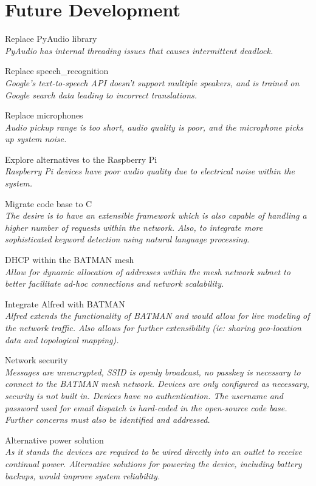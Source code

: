 \documentclass[11pt,a4paper]{article}
\begin{document}
\section{Future Development}
\begin{list}{-}{}
	\item{Replace PyAudio library}\\
	\phantom{00}\textit{PyAudio has internal threading issues that causes intermittent deadlock.}
	\item{Replace speech\_{}recognition}\\
	\phantom{00}\textit{Google's text-to-speech API doesn't support multiple speakers, and is trained on Google search data leading to incorrect translations.}
	\item{Replace microphones}\\
	\phantom{00}\textit{Audio pickup range is too short, audio quality is poor, and the microphone picks up system noise.}
	\item{Explore alternatives to the Raspberry Pi}\\
	\phantom{00}\textit{Raspberry Pi devices have poor audio quality due to electrical noise within the system.}
	\item{Migrate code base to C}\\
	\phantom{00}\textit{The desire is to have an extensible framework which is also capable of handling a higher number of requests within the network. Also, to integrate more sophisticated keyword detection using natural language processing.}	
	\item{DHCP within the BATMAN mesh}\\
	\phantom{00}\textit{Allow for dynamic allocation of addresses within the mesh network subnet to better facilitate ad-hoc connections and network scalability.}
	\item{Integrate Alfred with BATMAN}\\
	\phantom{00}\textit{Alfred extends the functionality of BATMAN and would allow for live modeling of the network traffic. Also allows for further extensibility (ie: sharing geo-location data and topological mapping).}
	\item{Network security}\\
	\phantom{00}\textit{Messages are unencrypted, SSID is openly broadcast, no passkey is necessary to connect to the BATMAN mesh network. Devices are only configured as necessary, security is not built in. Devices have no authentication. The username and password used for email dispatch is hard-coded in the open-source code base. Further concerns must also be identified and addressed.}
	\item{Alternative power solution}\\
	\phantom{00}\textit{As it stands the devices are required to be wired directly into an outlet to receive continual power. Alternative solutions for powering the device, including battery backups, would improve system reliability.}
\end{list}
\end{document}
